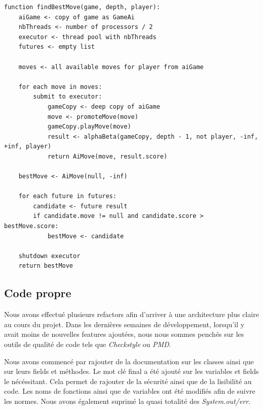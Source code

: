 \documentclass{article}
\begin{document}
\pagebreak
\begin{lstlisting}[label={AlphaBetaParallel}, caption={AlphaBeta version parallèle - pseudo-code}]
function findBestMove(game, depth, player):
    aiGame <- copy of game as GameAi
    nbThreads <- number of processors / 2
    executor <- thread pool with nbThreads
    futures <- empty list

    moves <- all available moves for player from aiGame

    for each move in moves:
        submit to executor:
            gameCopy <- deep copy of aiGame
            move <- promoteMove(move)
            gameCopy.playMove(move)
            result <- alphaBeta(gameCopy, depth - 1, not player, -inf, +inf, player)
            return AiMove(move, result.score)

    bestMove <- AiMove(null, -inf)

    for each future in futures:
        candidate <- future result
        if candidate.move != null and candidate.score > bestMove.score:
            bestMove <- candidate

    shutdown executor
    return bestMove
    \end{lstlisting}
    \FloatBarrier


\subsection{Code propre}
Nous avons effectué plusieurs refactors afin d'arriver à une architecture plus claire au cours du projet. Dans les dernières semaines de développement,
lorsqu'il y avait moins de nouvelles features ajoutées, nous nous sommes penchés sur les outils de qualité de code tels que \textit{Checkstyle} ou \textit{PMD}.

Nous avons commencé par rajouter de la documentation sur les classes ainsi que sur leurs fields et méthodes.
Le mot clé final a été ajouté sur les variables et fields le nécéssitant. Cela permet de rajouter de la sécurité ainsi que de la lisibilité au code.
Les noms de fonctions ainsi que de variables ont été modifiés afin de suivre les normes. Nous avons également suprimé la quasi totalité des \textit{System.out/err}.
\end{document}
